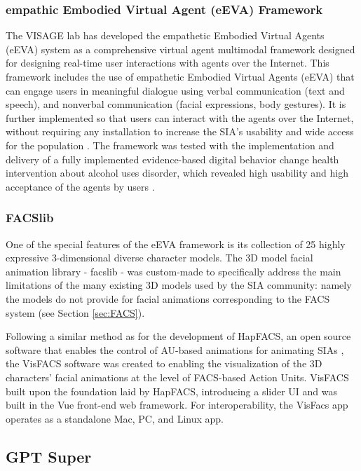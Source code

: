 \documentclass[12pt]{article}
\begin{document}
\subsubsection{empathic Embodied Virtual Agent (eEVA) Framework}
The VISAGE lab has developed the empathetic Embodied Virtual Agents (eEVA) system as 
 a comprehensive virtual agent multimodal framework designed for designing real-time user interactions with agents over the Internet. This framework includes the use of empathetic Embodied Virtual Agents (eEVA) that can engage users in meaningful dialogue using verbal communication (text and speech), and nonverbal communication (facial expressions, body gestures).  It is further implemented so that users can interact with the agents over the Internet, without requiring any installation to increase the SIA's usability and wide access for the population  \cite{PolceanuTimeCONCEPTS}.  The framework was tested with the implementation and delivery of a fully implemented evidence-based digital behavior change health intervention about alcohol uses disorder, which revealed high usability and high acceptance of the agents by users \cite{Amini2021a}\cite{Amini2015}.

\subsubsection{FACSlib}
\label{sec:facslib}

One of the special features of the eEVA framework is its collection of 25 highly expressive 3-dimensional diverse character models.  The 3D model facial animation library - facslib - was custom-made to specifically address the  main limitations of the many existing 3D models used by the SIA community: namely the models do not provide for facial animations corresponding to the FACS system (see Section \ref{sec:FACS}).

Following a similar method as for the development of HapFACS, an open source  software that enables the control of AU-based animations for animating SIAs \cite{Amini2015}, the VisFACS software was created to enabling the visualization of the 3D characters' facial animations at the level of FACS-based Action Units. 
VisFACS built upon the foundation laid by HapFACS, introducing a slider UI and was built in the Vue front-end web framework. For interoperability, the VisFacs app operates as a standalone Mac, PC, and Linux app.

\subsection{GPT Super}
\end{document}
